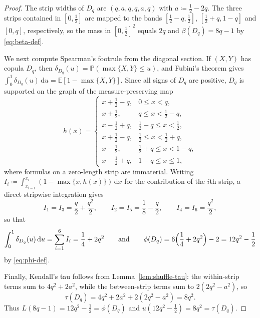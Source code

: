 \documentclass{article}
\newcommand{\de}{\,\mathrm{d}}
\begin{document}
\begin{proof}
The strip widths of $D_q$ are $(q,a,q,q,a,q)$ with $a\coloneqq \frac12-2q$.
The three strips contained in $[0,\frac12]$ are mapped to the bands $[\frac12-q,\frac12]$, $[\frac12+q,1-q]$ and $[0,q]$, respectively, so the mass in $[0,\frac12]^2$ equals $2q$ and $\beta(D_q)=8q-1$ by \eqref{eq:beta-def}.

We next compute Spearman's footrule from the diagonal section.
If $(X,Y)$ has copula $D_q$, then $\delta_{D_q}(u)=\mathbb{P}(\max\{X,Y\}\le u)$, and Fubini's theorem gives $\int_0^1\delta_{D_q}(u)\de u=\mathbb{E}[1-\max\{X,Y\}]$.
Since all signs of $D_q$ are positive, $D_q$ is supported on the graph of the measure-preserving map
\[
h(x)=
\begin{cases}
x+\frac12-q, & 0\le x<q,\\
x+\frac12, & q\le x<\frac12-q,\\
x-\frac12+q, & \frac12-q\le x<\frac12,\\
x+\frac12-q, & \frac12\le x<\frac12+q,\\
x-\frac12, & \frac12+q\le x<1-q,\\
x-\frac12+q, & 1-q\le x\le1,
\end{cases}
\]
where formulas on a zero-length strip are immaterial.
Writing $I_i\coloneqq \int_{x_{i-1}}^{x_i}(1-\max\{x,h(x)\})\de x$ for the contribution of the $i$th strip, a direct stripwise integration gives
\[
I_1=I_3=\frac q2+\frac{q^2}{2},\qquad
I_2=I_5=\frac18-\frac q2,\qquad
I_4=I_6=\frac{q^2}{2},
\]
so that
\[
\int_0^1\delta_{D_q}(u)\de u=\sum_{i=1}^6 I_i=\frac14+2q^2
\qquad\text{and}\qquad
\phi(D_q)=6\Bigl(\frac14+2q^2\Bigr)-2=12q^2-\frac12
\]
by \eqref{eq:phi-def}.

Finally, Kendall's tau follows from Lemma~\ref{lem:shuffle-tau}: the within-strip terms sum to $4q^2+2a^2$, while the between-strip terms sum to $2(2q^2-a^2)$, so
\[
\tau(D_q)=4q^2+2a^2+2(2q^2-a^2)=8q^2.
\]
Thus $L(8q-1)=12q^2-\frac12=\phi(D_q)$ and $u(12q^2-\frac12)=8q^2=\tau(D_q)$.
\end{proof}
\end{document}
